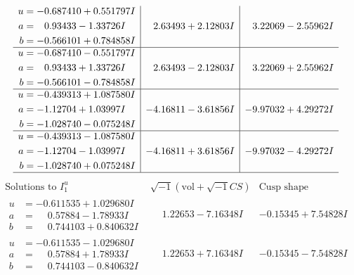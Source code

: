 \documentclass[1p]{elsarticle_modified}
\theoremstyle{definition}
\newcommand{\I}{\sqrt{-1}}
\begin{document}
$$\begin{array}{c|c|c}
\begin{aligned}
u &= -0.687410 + 0.551797 I \\
a &= \phantom{-}0.93433 - 1.33726 I \\
b &= -0.566101 + 0.784858 I\end{aligned}
 & \phantom{-}2.63493 + 2.12803 I & \phantom{-}3.22069 - 2.55962 I \\ \hline\begin{aligned}
u &= -0.687410 - 0.551797 I \\
a &= \phantom{-}0.93433 + 1.33726 I \\
b &= -0.566101 - 0.784858 I\end{aligned}
 & \phantom{-}2.63493 - 2.12803 I & \phantom{-}3.22069 + 2.55962 I \\ \hline\begin{aligned}
u &= -0.439313 + 1.087580 I \\
a &= -1.12704 + 1.03997 I \\
b &= -1.028740 - 0.075248 I\end{aligned}
 & -4.16811 - 3.61856 I & -9.97032 + 4.29272 I \\ \hline\begin{aligned}
u &= -0.439313 - 1.087580 I \\
a &= -1.12704 - 1.03997 I \\
b &= -1.028740 + 0.075248 I\end{aligned}
 & -4.16811 + 3.61856 I & -9.97032 - 4.29272 I\\
 \hline 
 \end{array}$$\newpage$$\begin{array}{c|c|c}  
\text{Solutions to }I^u_{1}& \I (\text{vol} + \sqrt{-1}CS) & \text{Cusp shape}\\
 \hline 
\begin{aligned}
u &= -0.611535 + 1.029680 I \\
a &= \phantom{-}0.57884 - 1.78933 I \\
b &= \phantom{-}0.744103 + 0.840632 I\end{aligned}
 & \phantom{-}1.22653 - 7.16348 I & -0.15345 + 7.54828 I \\ \hline\begin{aligned}
u &= -0.611535 - 1.029680 I \\
a &= \phantom{-}0.57884 + 1.78933 I \\
b &= \phantom{-}0.744103 - 0.840632 I\end{aligned}
 & \phantom{-}1.22653 + 7.16348 I & -0.15345 - 7.54828 I \\ \hline\begin{aligned}

\end{aligned}
\end{array}$$
\end{document}

